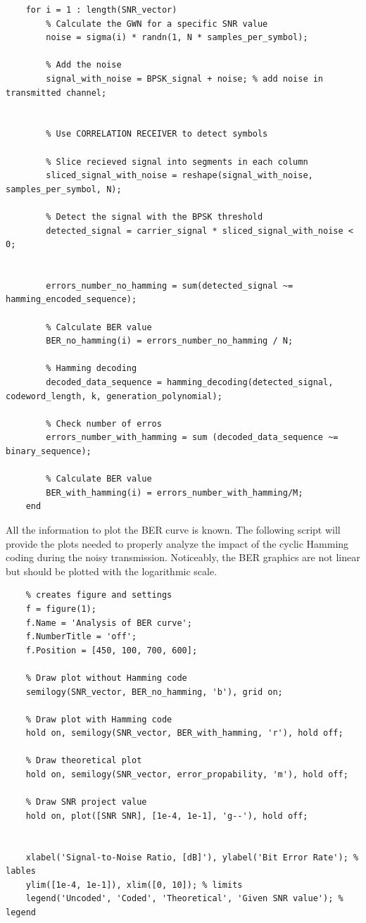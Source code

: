 \begin{lstlisting}
    for i = 1 : length(SNR_vector)
        % Calculate the GWN for a specific SNR value
        noise = sigma(i) * randn(1, N * samples_per_symbol);

        % Add the noise
        signal_with_noise = BPSK_signal + noise; % add noise in transmitted channel;


        % Use CORRELATION RECEIVER to detect symbols

        % Slice recieved signal into segments in each column
        sliced_signal_with_noise = reshape(signal_with_noise, samples_per_symbol, N);

        % Detect the signal with the BPSK threshold
        detected_signal = carrier_signal * sliced_signal_with_noise < 0;

        
        errors_number_no_hamming = sum(detected_signal ~= hamming_encoded_sequence);

        % Calculate BER value
        BER_no_hamming(i) = errors_number_no_hamming / N;

        % Hamming decoding
        decoded_data_sequence = hamming_decoding(detected_signal, codeword_length, k, generation_polynomial); 

        % Check number of erros
        errors_number_with_hamming = sum (decoded_data_sequence ~= binary_sequence);

        % Calculate BER value
        BER_with_hamming(i) = errors_number_with_hamming/M;
    end
\end{lstlisting}

\noindent All the information to plot the BER curve is known. The following script will provide the plots needed to properly analyze the impact of the cyclic Hamming coding during the noisy transmission. Noticeably, the BER graphics are not linear but should be plotted with the logarithmic scale.

\begin{lstlisting}
    % creates figure and settings
    f = figure(1);
    f.Name = 'Analysis of BER curve';
    f.NumberTitle = 'off';
    f.Position = [450, 100, 700, 600];
    
    % Draw plot without Hamming code
    semilogy(SNR_vector, BER_no_hamming, 'b'), grid on;

    % Draw plot with Hamming code
    hold on, semilogy(SNR_vector, BER_with_hamming, 'r'), hold off;

    % Draw theoretical plot
    hold on, semilogy(SNR_vector, error_propability, 'm'), hold off;

    % Draw SNR project value
    hold on, plot([SNR SNR], [1e-4, 1e-1], 'g--'), hold off;

    
    xlabel('Signal-to-Noise Ratio, [dB]'), ylabel('Bit Error Rate'); % lables
    ylim([1e-4, 1e-1]), xlim([0, 10]); % limits
    legend('Uncoded', 'Coded', 'Theoretical', 'Given SNR value'); % legend
\end{lstlisting}

